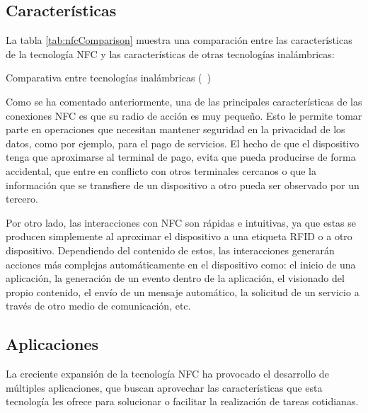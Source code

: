   \subsection{Características}

La tabla \ref{tab:nfcComparison} muestra una comparación entre 
las características de la tecnología \acs{NFC} y las características de 
otras tecnologías inalámbricas:

\begin{sidewaystable}[hp]
  \centering
  {\footnotesize
  
  }
  \caption[Comparativa entre tecnologías inalámbricas]
  {Comparativa entre tecnologías inalámbricas (~\cite{bib:nfcComparison})}
  \label{tab:nfcComparison}
\end{sidewaystable}

Como se ha comentado anteriormente, una de las principales características de 
las conexiones \acs{NFC} es que su radio de acción es muy pequeño. Esto le
permite tomar parte en operaciones que necesitan mantener seguridad en la
privacidad de los datos, como por ejemplo, para el pago de servicios. El
hecho de que el dispositivo tenga que aproximarse al terminal de pago, evita
que pueda producirse de forma accidental, que entre en conflicto con otros
terminales cercanos o que la información que se transfiere de un dispositivo
a otro pueda ser observado por un tercero.

Por otro lado, las interacciones con \acs{NFC} son rápidas e intuitivas, ya 
que estas se producen  simplemente al aproximar el dispositivo a una etiqueta 
\acs{RFID} o a otro dispositivo. Dependiendo del contenido de estos, las 
interacciones generarán acciones más complejas automáticamente en el 
dispositivo como: el inicio de una aplicación, la generación de un evento 
dentro de la aplicación, el visionado del propio contenido, el envío de un 
mensaje automático, la solicitud de un servicio a través de otro medio de 
comunicación, etc.

  \subsection{Aplicaciones}
La creciente expansión de la tecnología \acs{NFC} ha provocado el desarrollo
de múltiples aplicaciones, que buscan aprovechar las características que esta 
tecnología les ofrece para solucionar o facilitar la realización de tareas 
cotidianas.

